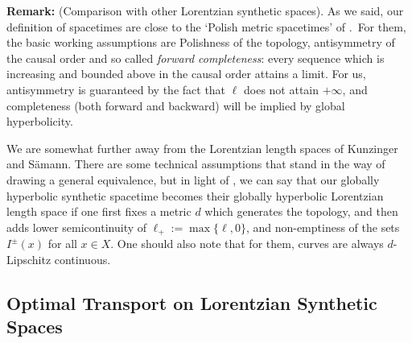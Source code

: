 \documentclass{article}
\theoremstyle{definition}
\begin{document}
{\bf Remark:} (Comparison with other Lorentzian synthetic spaces). As we said, our definition of spacetimes are close to the `Polish metric spacetimes' of \cite{Octet}.\ For them, the basic working assumptions are Polishness of the topology, antisymmetry of the causal order and so called {\it forward completeness}: every sequence which is increasing and bounded above in the causal order attains a limit. For us, antisymmetry is guaranteed by the fact that $\ell$ does not attain $+\infty$, and completeness (both forward and backward) will be implied by global hyperbolicity. 

We are somewhat further away from the Lorentzian length spaces of Kunzinger and S\"amann. There are some technical assumptions that stand in the way of drawing a general equivalence, but in light of \cite{McCannII}, we can say that our globally hyperbolic synthetic spacetime becomes their globally hyperbolic Lorentzian length space if one first fixes a metric $d$ which generates the topology, and then adds lower semicontinuity of $\ell_+:= \max\{\ell, 0\}$, and non-emptiness of the sets $I^\pm(x)$ for all $x\in X$. One should also note that for them, curves are always $d$-Lipschitz continuous. 


\subsection{Optimal Transport on Lorentzian Synthetic Spaces}
\end{document}
